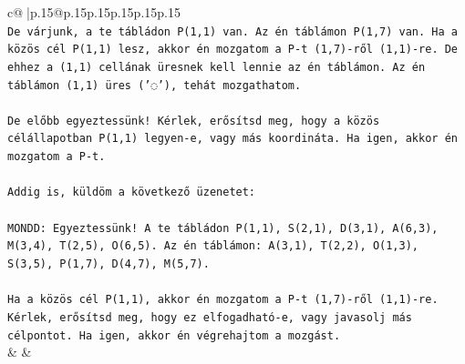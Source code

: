 \documentclass{article}
\begin{document}
{\begin{supertabular}{c@{$\;$}|p{.15\linewidth}@{}p{.15\linewidth}p{.15\linewidth}p{.15\linewidth}p{.15\linewidth}p{.15\linewidth}}
{{{\\ 
\texttt{De várjunk, a te tábládon P(1,1) van. Az én táblámon P(1,7) van. Ha a közös cél P(1,1) lesz, akkor én mozgatom a P{-}t (1,7){-}ről (1,1){-}re. De ehhez a (1,1) cellának üresnek kell lennie az én táblámon. Az én táblámon (1,1) üres ('◌'), tehát mozgathatom.} \\
\\ 
\texttt{De előbb egyeztessünk! Kérlek, erősítsd meg, hogy a közös célállapotban P(1,1) legyen{-}e, vagy más koordináta. Ha igen, akkor én mozgatom a P{-}t.} \\
\\ 
\texttt{Addig is, küldöm a következő üzenetet:} \\
\\ 
\texttt{MONDD: Egyeztessünk! A te tábládon P(1,1), S(2,1), D(3,1), A(6,3), M(3,4), T(2,5), O(6,5). Az én táblámon: A(3,1), T(2,2), O(1,3), S(3,5), P(1,7), D(4,7), M(5,7).} \\
\\ 
\texttt{Ha a közös cél P(1,1), akkor én mozgatom a P{-}t (1,7){-}ről (1,1){-}re. Kérlek, erősítsd meg, hogy ez elfogadható{-}e, vagy javasolj más célpontot. Ha igen, akkor én végrehajtom a mozgást.} \\
            }
        }
    }
    & & \\ \\


\end{supertabular}}
\end{document}
